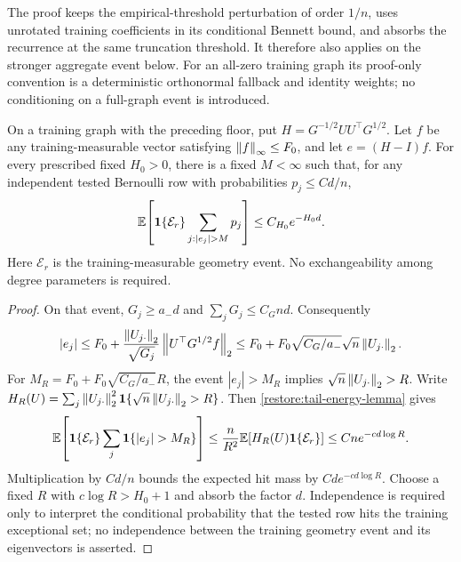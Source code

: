The proof keeps the empirical-threshold perturbation of order $1/n$,
uses unrotated training coefficients in its conditional Bennett bound,
and absorbs the recurrence at the same truncation threshold. It therefore
also applies on the stronger aggregate event below. For an all-zero
training graph its proof-only convention is a deterministic orthonormal
fallback and identity weights; no conditioning on a full-graph event
is introduced.

\begin{corollary}
\label{restore:tail-hit-corollary}
On a training graph with the preceding floor, put
$H=G^{-1/2}UU^\top G^{1/2}$.
Let $f$ be any training-measurable vector satisfying
$\left\lVert f\right\rVert_\infty\le F_0$, and let $e=(H-I)f$.
For every prescribed fixed $H_0>0$, there is a fixed $M<\infty$
such that, for any independent tested Bernoulli row with probabilities
$p_j\le Cd/n$,
\begin{equation}
 \E\!\left[\ind{\mathcal E_r}
                 \sum_{j:|e_j|>M}p_j\right]
 \le C_{H_0}e^{-H_0d}.
 \label{restore:tail-hit-mass}
\end{equation}
Here $\mathcal E_r$ is the training-measurable geometry event.
No exchangeability among degree parameters is required.
\end{corollary}

\begin{proof}
On that event, $G_j\ge a_-d$ and $\sum_jG_j\le C_Gnd$.
Consequently
\[
 |e_j|
 \le F_0+\frac{\left\lVert U_{j\cdot}\right\rVert_2}{\sqrt{G_j}}
                  \left\lVert U^\top G^{1/2}f\right\rVert_2
 \le F_0+F_0\sqrt{C_G/a_-}\sqrt n\left\lVert U_{j\cdot}\right\rVert_2.
\]
For $M_R=F_0+F_0\sqrt{C_G/a_-}R$, the event
$|e_j|>M_R$ implies $\sqrt n\left\lVert U_{j\cdot}\right\rVert_2>R$.
Write $H_R(U)=\sum_j\left\lVert U_{j\cdot}\right\rVert_2^2
\mathbf1\{\sqrt n\left\lVert U_{j\cdot}\right\rVert_2>R\}$.
Then \cref{restore:tail-energy-lemma} gives
\begin{equation}
 \E\!\left[\ind{\mathcal E_r}
                    \sum_j\ind{|e_j|>M_R}\right]
 \le\frac n{R^2}\E[H_R(U)\ind{\mathcal E_r}]
 \le Cne^{-cd\log R}.
 \label{restore:tail-coefficient-count}
\end{equation}
Multiplication by $Cd/n$ bounds the expected hit mass by
$Cd e^{-cd\log R}$.
Choose a fixed $R$ with $c\log R>H_0+1$ and absorb the factor $d$.
Independence is required only to interpret the conditional probability
that the tested row hits the training exceptional set; no independence
between the training geometry event and its eigenvectors is asserted.
\end{proof}

